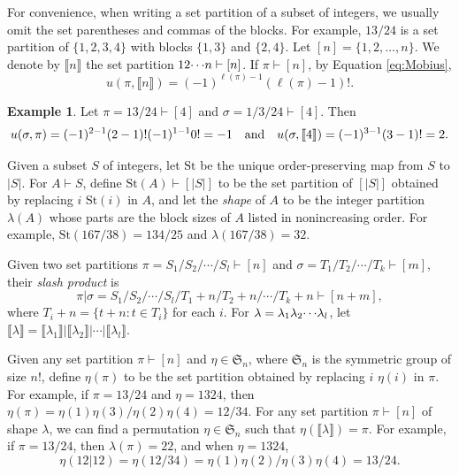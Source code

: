 \documentclass[12pt]{amsart}  %
\theoremstyle{definition}
\newtheorem{example}[theorem]{Example}
\theoremstyle{remark}
\numberwithin{equation}{section}
\newcommand{\St}{{\mathrm{St}}}
\newcommand{\stn}{{\llbracket n \rrbracket}}
\newcommand{\mymu}{{u}}
\newcommand\svw[1]{{\color{black}{#1}}}
\begin{document}
   For convenience, when writing a set partition of a subset of integers, we
usually omit the set parentheses and commas
of the blocks. For example,  $13/24$ is a set partition of $\{1,2,3,4\}$ with blocks $\{1,3\}$ and $\{2,4\}$. Let $[n]=\{1,2,\ldots,n\}$.  We denote by $\stn$ the set partition $12\svw{\cdots} n \vdash [n]$.    
If $\pi\vdash [n]$, by Equation \eqref{eq:Mobius},
\begin{equation}\label{eq:mymun}\mymu(\pi,\stn)= (-1)^{\ell(\pi)-1}(\ell(\pi)-1)!.\end{equation}
\begin{example}\label{ex:mu}
Let $\pi=13/24\vdash [4]$ and $\sigma=1/3/24\vdash [4]$. Then 
$$u(\svw{\sigma, \pi})=(-1)^{2-1}(2-1)!(-1)^{1-1}0!=-1\quad \text{and}\quad u(\sigma,\llbracket 4 \rrbracket)=(-1)^{3-1}(3-1)!=2.$$
\end{example} 





Given a subset $S$ of integers, let $\St$ be the unique order-preserving map from $S$ to $|S|$. For $A\vdash S$, define $\St(A)\vdash [|S|]$ to be the set partition of $[|S|]$ obtained by replacing $i$ \svw{with} $\St(i)$ in $A$, and let the \emph{shape} of $A$ to be the integer partition $\lambda(A)$ whose parts are the block sizes of $A$ listed in nonincreasing order. For example, $\St(167/38)=134/25$ and $\lambda(167/38)=32$.
  

  
  
  Given two set partitions $\pi=S_1/S_2/\cdots/S_l\vdash [n]$ and $\sigma=T_1/T_2/\cdots/T_k\vdash [m]$, their \emph{slash product} is 
$$\pi|\sigma=S_1/S_2/\cdots/S_l/T_1+n/T_2+n/\cdots/T_k+n\vdash [n+m],$$
where $T_i+n=\{t+n:t\in T_i\}$ for each $i$.  For $\lambda=\lambda_1\lambda_2\svw{\cdots} \lambda_l$, let $\llbracket \lambda \rrbracket=\llbracket\lambda_1\rrbracket|\llbracket\lambda_2\rrbracket|\cdots|\llbracket\lambda_l\rrbracket.$



Given any set partition $\pi\vdash [n]$ and $\eta\in \mathfrak{S}_n$, where $\mathfrak{S}_n$ is the
symmetric group of size $n!$, define $\eta(\pi)$ to be the set partition obtained by replacing $i$ \svw{with} $\eta(i)$ in $\pi$. For example, if $\pi=13/24$ and $\eta=1324$, \svw{in one-line notation,} then $\eta(\pi)=\eta(1)\eta(3)/\eta(2)\eta(4)=12/34$.   For any set partition $\pi\vdash [n]$ of shape $\lambda$, we can find a permutation $\eta\in \mathfrak{S}_n$ such that  $\eta(\llbracket \lambda\rrbracket)=\pi$. For example, if $\pi=13/24$, then $\lambda(\pi)=22$, and  when $\eta=1324$, 
$$\eta(12|12)=\eta(12/34)=\eta(1)
\eta(2)/\eta(3)\eta(4)=13/24.$$
\end{document}

